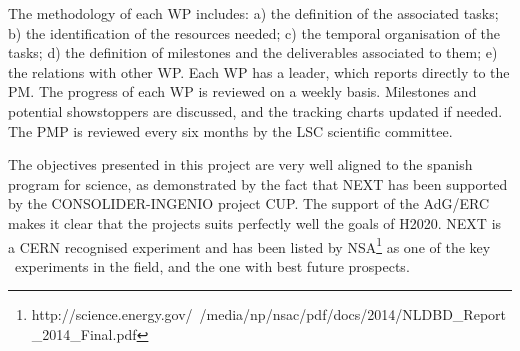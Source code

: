 The methodology of each WP includes: a) the definition of the associated tasks; b) the identification of the resources needed; c) the temporal organisation of the tasks; d) the definition of milestones and the deliverables associated to them; e) the relations with other WP. Each WP has a leader, which reports directly to the PM. The progress of each WP is reviewed on a weekly basis. Milestones and potential showstoppers are discussed, and the tracking charts updated if needed. The PMP is reviewed every six months by the LSC scientific committee.  

The objectives presented in this project are very well aligned to the spanish program for science, as demonstrated by the fact that NEXT has been supported by the CONSOLIDER-INGENIO project CUP. The support of the AdG/ERC makes it clear that the projects suits perfectly well the goals of H2020. NEXT is a CERN recognised experiment and has been listed by NSA\footnote{http://science.energy.gov/~/media/np/nsac/pdf/docs/2014/NLDBD\_Report\_2014\_Final.pdf} as one of the key \bbonu\ experiments in the field, and the one with best future prospects.




